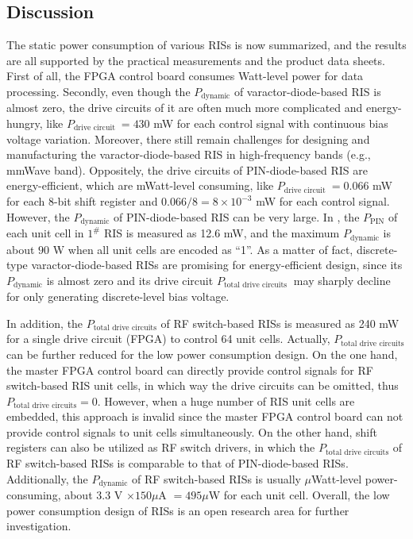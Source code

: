\documentclass[journal]{IEEEtran}
\begin{document}
\subsection{Discussion}
The static power consumption of various RISs is now summarized, and the results are all supported by the practical measurements and the product data sheets. First of all, the FPGA control board consumes Watt-level power for data processing.
Secondly, even though the $P_{\text {dynamic}}$ of varactor-diode-based RIS is almost zero, the drive circuits of it are often much more complicated and energy-hungry, like $P_{\text {drive circuit }}= 430 $ mW for each control signal with continuous bias voltage variation. Moreover, there still remain challenges for designing and manufacturing the varactor-diode-based RIS in high-frequency bands (e.g., mmWave band). Oppositely, the drive circuits of PIN-diode-based RIS are energy-efficient, which are mWatt-level consuming, like $P_{\text {drive circuit }}= 0.066 $ mW for each 8-bit shift register and $ 0.066/8= 8 \times 10^{-3} $ mW for each control signal. However, the $P_{\text {dynamic}}$ of PIN-diode-based RIS can be very large. In \cite{wang2022reconfigurable}, 
the $P_{\text {PIN}}$ of each unit cell in $1^{\#}$ RIS is measured as 12.6 mW, and the maximum $P_{\text {dynamic}}$ is about $90$ W when all unit cells are encoded as “1”. As a matter of fact, discrete-type varactor-diode-based RISs are promising for energy-efficient design, since its $P_{\text {dynamic}}$ is almost zero and its drive circuit $P_{\text {total drive circuits }}$ may sharply decline for only generating discrete-level bias voltage.

In addition, the $P_{\text {total drive circuits}}$ of RF switch-based RISs is measured as 240 mW for a single drive circuit (FPGA) to control 64 unit cells. Actually, $P_{\text {total drive circuits}}$ can be further reduced for the low power consumption design. On the one hand, the master FPGA control board can directly provide control signals for RF switch-based RIS unit cells, in which way the drive circuits can be omitted, thus $P_{\text {total drive circuits}} = 0$. However, when a huge number of RIS unit cells are embedded, this approach is invalid since the master FPGA control board can not provide control signals to unit cells simultaneously. On the other hand, shift registers can also be utilized as RF switch drivers, in which the $P_{\text {total drive circuits}}$ of RF switch-based RISs is comparable to that of PIN-diode-based RISs. Additionally, the $P_{\text {dynamic}}$ of RF switch-based RISs is usually ${\mu}$Watt-level power-consuming, about $3.3$ V $\times 150 \mu$A $= 495 \mu$W for each unit cell.
Overall, the low power consumption design of RISs is an open research area for further investigation.
\end{document}

